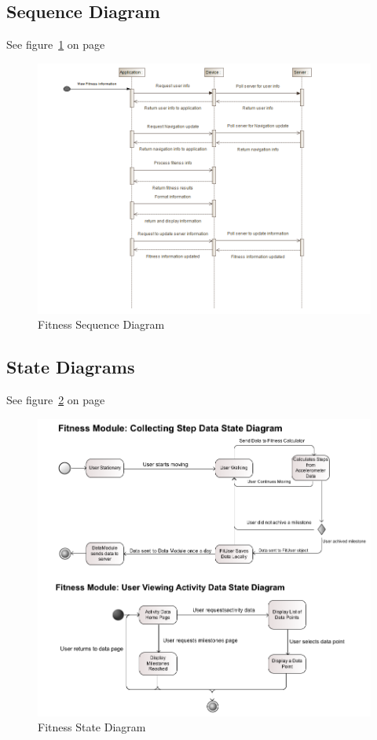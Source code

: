 \subsection{Sequence Diagram}
See figure~\ref{fig:Fitness_Sequence_Diagram} on page~\pageref{fig:Fitness_Sequence_Diagram}
\begin{figure}
	\centering
	\includegraphics[scale=0.70]{Fitness/fitness_sequence_diagram.png}
	\caption{Fitness Sequence Diagram}
	\label{fig:Fitness_Sequence_Diagram}
\end{figure}

\subsection{State Diagrams}
See figure~\ref{fig:fitness_state_diagram} on page~\pageref{fig:fitness_state_diagram}
\begin{figure}
	\centering
	\includegraphics[scale=0.54]{Fitness/fitness_state_diagram.png}
	\caption{Fitness State Diagram}
	\label{fig:fitness_state_diagram}
\end{figure}

